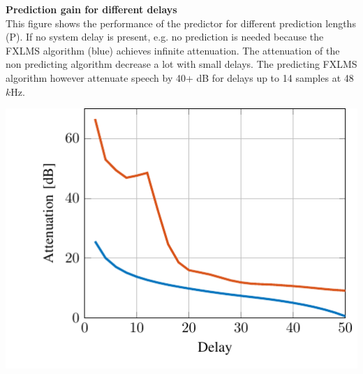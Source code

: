 \begin{minipage}{.5\columnwidth}
	\textbf{Prediction gain for different delays}\\
	This figure shows the performance of the predictor for different prediction lengths (P). If no system delay is present, e.g. no prediction is needed because the FXLMS algorithm (blue) achieves infinite attenuation. The attenuation of the non predicting algorithm decrease a lot with small delays. The predicting FXLMS algorithm however attenuate speech by 40+ dB for delays up to 14 samples at 48 $k$Hz.
\end{minipage}%
\begin{minipage}{0.5\columnwidth}
	\includegraphics[width=\textwidth]{figures/DelayRatio.pdf}
\end{minipage}

